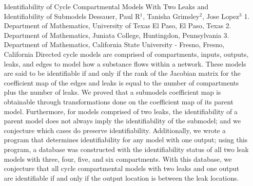 \vspace{1.5ex}
\abs
{Identifiability of Cycle Compartmental Models With Two Leaks and Identifiability of Submodels}
{Dessauer, Paul R$^1$, Tanisha Grimsley$^2$, Jose Lopez$^3$}
{1. Department of Mathematics, University of Texas El Paso, El Paso, Texas 2. Department of Mathematics, Juniata College, Huntingdon, Pennsylvania 3. Department of Mathematics, California State University - Fresno, Fresno, California}
{Directed cycle models are comprised of compartments, inputs, outputs,
leaks, and edges to model how a substance flows within a network. These models are
said to be identifiable if and only if the rank of the Jacobian matrix for the coefficient
map of the edges and leaks is equal to the number of compartments plus the number of
leaks. We proved that a submodels coefficient map is obtainable through transformations done on the coefficient map of its parent model. Furthermore, for models comprised of two leaks, the identifiability of a parent model does not always imply the identifiability of the submodel; and we conjecture which cases do preserve identifiability. Additionally, we wrote a program that determines identifiability for any model with one output; using this program, a database was constructed with the identifiability status of all two leak models with three, four, five, and six compartments. With this database, we conjecture that all cycle compartmental models with two leaks and one output are identifiable if and only if the output location is between the leak locations.}





